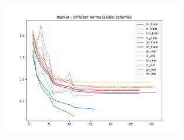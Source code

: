 \documentclass[12pt]{article}
\begin{document}
\begin{center}
    \begin{figure}[!htbp]
    \centering
    \includegraphics[width=0.7\textwidth]{../ResNet/q2_part3.pdf}
\end{figure}

\end{center}
\end{document}
